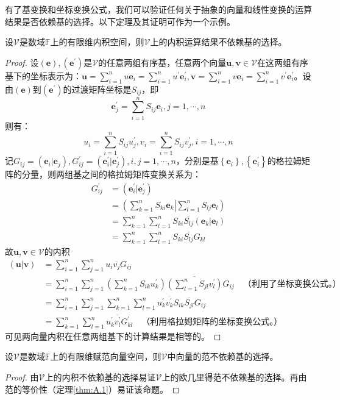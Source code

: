 \documentclass[../main.tex]{subfiles}
\begin{document}
有了基变换和坐标变换公式，我们可以验证任何关于抽象的向量和线性变换的运算结果是否依赖基的选择。以下定理及其证明可作为一个示例。

\begin{theorem}\label{thm:II.2.23}
    设$\mathcal{V}$是数域$\mathbb{F}$上的有限维内积空间，则$\mathcal{V}$上的内积运算结果不依赖基的选择。
\end{theorem}
\begin{proof}
    设$\left(\mathbf{e}\right),\left(\mathbf{e}^\prime\right)$是$\mathcal{V}$的任意两组有序基，任意两个向量$\mathbf{u},\mathbf{v}\in\mathcal{V}$在这两组有序基下的坐标表示为：$\mathbf{u}=\sum_{i=1}^nu\mathbf{e}_i=\sum_{i=1}^nu^\prime\mathbf{e}^\prime_i,\mathbf{v}=\sum_{i=1}^nv\mathbf{e}_i=\sum_{i=1}^nv^\prime\mathbf{e}^\prime_i$。设由$\left(\mathbf{e}\right)$到$\left(\mathbf{e}^\prime\right)$的过渡矩阵坐标是$S_{ij}$，即
    \[
        \mathbf{e}_j^\prime=\sum_{i=1}^nS_{ij}\mathbf{e}_i,j=1,\cdots,n\]
    则有：
    \[u_i=\sum_{i=1}^nS_{ij}u^\prime_j,v_i=\sum_{i=1}^nS_{ij}v^\prime_j,i=1,\cdots,n\]
    记$G_{ij}=\left(\mathbf{e}_i|\mathbf{e}_j\right),G_{ij}^\prime=\left(\mathbf{e}^\prime_i|\mathbf{e}^\prime_j\right),i,j=1,\cdots,n$，分别是基$\left\{\mathbf{e}_i\right\},\left\{\mathbf{e}^\prime_i\right\}$的格拉姆矩阵的分量，则两组基之间的格拉姆矩阵变换关系为：
    \begin{align*}
        G^\prime_{ij} & =\left(\mathbf{e}^\prime_i|\mathbf{e}^\prime_j\right)                                     \\
                      & =\left(\sum_{k=1}^n S_{ki}\mathbf{e}_k\right|\left.\sum_{l=1}^n S_{lj}\mathbf{e}_l\right) \\
                      & =\sum_{k=1}^n\sum_{l=1}^nS_{ki}\overline{S_{lj}}\left(\mathbf{e}_k|\mathbf{e}_l\right)    \\
                      & =\sum_{k=1}^n\sum_{l=1}^nS_{ki}\overline{S_{lj}}G_{kl}
    \end{align*}
    故$\mathbf{u},\mathbf{v}\in\mathcal{V}$的内积
    \begin{align*}
        \left(\mathbf{u}|\mathbf{v}\right) & =\sum_{i=1}^n\sum_{j=1}^nu_i\overline{v_j}G_{ij}                                                                                                     \\
                                           & =\sum_{i=1}^n\sum_{j=1}^n\left(\sum_{k=1}^nS_{ik}u_k^\prime\right)\overline{\left(\sum_{l=1}^nS_{jl}v_l^\prime\right)}G_{ij}\quad\text{（利用了坐标变换公式。）} \\
                                           & =\sum_{i=1}^n\sum_{j=1}^n\sum_{k=1}^n\sum_{l=1}^nu_k^\prime\overline{v_k^\prime}S_{ik}\overline{S_{jl}}G_{ij}                                        \\
                                           & =\sum_{k=1}^n\sum_{l=1}^nu_k^\prime\overline{v_l^\prime}G_{kl}^\prime\quad\text{（利用格拉姆矩阵的坐标变换公式。）}
    \end{align*}
    可见两向量内积在任意两组基下的计算结果是相等的。
\end{proof}
\begin{corollary}
    设$\mathcal{V}$是数域$\mathbb{F}$上的有限维赋范向量空间，则$\mathcal{V}$中向量的范不依赖基的选择。
\end{corollary}
\begin{proof}
    由$\mathcal{V}$上的内积不依赖基的选择易证$\mathcal{V}$上的欧几里得范不依赖基的选择。再由范的等价性（定理\ref{thm:A.1}）易证该命题。
\end{proof}
\end{document}
